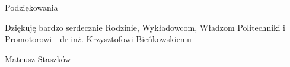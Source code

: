 \noindent
{\Large Podziękowania}
\bigskip

Dziękuję bardzo serdecznie Rodzinie, Wykładowcom, Władzom Politechniki i Promotorowi - dr inż. Krzysztofowi Bieńkowskiemu

\bigskip

{\raggedleft
Mateusz Staszków

}

